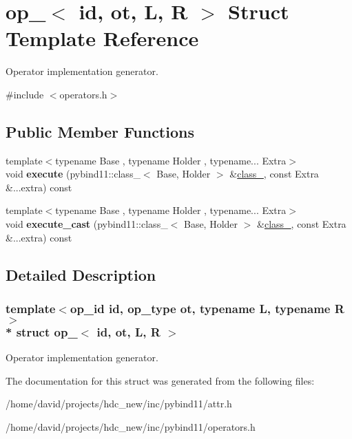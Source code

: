 \hypertarget{structop__}{}\section{op\+\_\+$<$ id, ot, L, R $>$ Struct Template Reference}
\label{structop__}


Operator implementation generator.  




{\ttfamily \#include $<$operators.\+h$>$}

\subsection*{Public Member Functions}
\begin{DoxyCompactItemize}
\item 
{\footnotesize template$<$typename Base , typename Holder , typename... Extra$>$ }\\void {\bfseries execute} (pybind11\+::class\+\_\+$<$ Base, Holder $>$ \&\hyperlink{classclass__}{class\+\_\+}, const Extra \&...extra) const \hypertarget{structop___a3874c36c804d478db400a95717024dbe}{}\label{structop___a3874c36c804d478db400a95717024dbe}

\item 
{\footnotesize template$<$typename Base , typename Holder , typename... Extra$>$ }\\void {\bfseries execute\+\_\+cast} (pybind11\+::class\+\_\+$<$ Base, Holder $>$ \&\hyperlink{classclass__}{class\+\_\+}, const Extra \&...extra) const \hypertarget{structop___a0e22b91cd5a5e95a80f6b1a9219c3cc0}{}\label{structop___a0e22b91cd5a5e95a80f6b1a9219c3cc0}

\end{DoxyCompactItemize}


\subsection{Detailed Description}
\subsubsection*{template$<$op\+\_\+id id, op\+\_\+type ot, typename L, typename R$>$\\*
struct op\+\_\+$<$ id, ot, L, R $>$}

Operator implementation generator. 

The documentation for this struct was generated from the following files\+:\begin{DoxyCompactItemize}
\item 
/home/david/projects/hdc\+\_\+new/inc/pybind11/attr.\+h\item 
/home/david/projects/hdc\+\_\+new/inc/pybind11/operators.\+h\end{DoxyCompactItemize}
